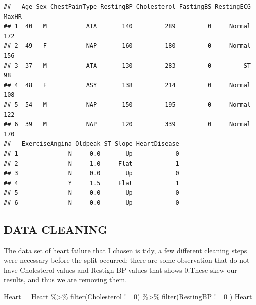 \documentclass[
]{article}
\newenvironment{Shaded}{\begin{snugshade}}{\end{snugshade}}
\newcommand{\DecValTok}[1]{\textcolor[rgb]{0.00,0.00,0.81}{#1}}
\newcommand{\FunctionTok}[1]{\textcolor[rgb]{0.00,0.00,0.00}{#1}}
\newcommand{\NormalTok}[1]{#1}
\newcommand{\OtherTok}[1]{\textcolor[rgb]{0.56,0.35,0.01}{#1}}
\newcommand{\SpecialCharTok}[1]{\textcolor[rgb]{0.00,0.00,0.00}{#1}}
\begin{document}
\begin{verbatim}
##   Age Sex ChestPainType RestingBP Cholesterol FastingBS RestingECG MaxHR
## 1  40   M           ATA       140         289         0     Normal   172
## 2  49   F           NAP       160         180         0     Normal   156
## 3  37   M           ATA       130         283         0         ST    98
## 4  48   F           ASY       138         214         0     Normal   108
## 5  54   M           NAP       150         195         0     Normal   122
## 6  39   M           NAP       120         339         0     Normal   170
##   ExerciseAngina Oldpeak ST_Slope HeartDisease
## 1              N     0.0       Up            0
## 2              N     1.0     Flat            1
## 3              N     0.0       Up            0
## 4              Y     1.5     Flat            1
## 5              N     0.0       Up            0
## 6              N     0.0       Up            0
\end{verbatim}

\hypertarget{data-cleaning}{%
\subsection{DATA CLEANING}\label{data-cleaning}}

The data set of heart failure that I chosen is tidy, a few different
cleaning steps were necessary before the split occurred: there are some
observation that do not have Cholesterol values and Restign BP values
that shows 0.These skew our results, and thus we are removing them.

\begin{Shaded}
\begin{Highlighting}[]
\NormalTok{Heart }\OtherTok{=}\NormalTok{ Heart }\SpecialCharTok{\%\textgreater{}\%} 
  \FunctionTok{filter}\NormalTok{(Cholesterol }\SpecialCharTok{!=} \DecValTok{0}\NormalTok{) }\SpecialCharTok{\%\textgreater{}\%} 
  \FunctionTok{filter}\NormalTok{(RestingBP }\SpecialCharTok{!=} \DecValTok{0}\NormalTok{ )}
\NormalTok{Heart}
\end{Highlighting}
\end{Shaded}
\end{document}
